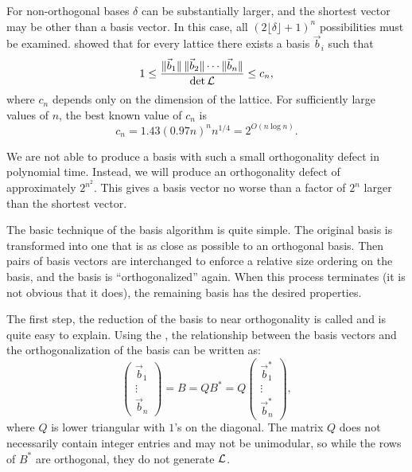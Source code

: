 For non-orthogonal bases $\delta$ can be substantially larger, and the
shortest vector may be other than a basis vector.  In this case, all
$(2\lfloor \delta\rfloor + 1)^n$ possibilities must be examined.
{\Hermite} \cite{Hermite1950-ae} showed that for every lattice there
exists a basis $\vec{b}_i$ such that
\[
1 \le \frac{\|\vec{b}_1\| \, \|\vec{b}_2\| \cdots \|\vec{b}_n\|}{\det {\cal L}}
   \le c_n,
\]
where $c_n$ depends only on the dimension of the lattice.  For
sufficiently large values of $n$, the best known value of $c_n$ is
\[
c_n = 1.43 (0.97 n)^n n^{1/4} = 2^{O(n\log n)}.
\]

We are not able to produce a basis with such a small orthogonality
defect in polynomial time.  Instead, we will produce an orthogonality
defect of approximately $2^{n^2}$.  This gives a basis vector no
worse than a factor of $2^n$ larger than the shortest vector.

\medskip
The basic technique of the {\Lovasz} basis algorithm is quite simple.
The original basis is transformed into one that is as close as
possible to an orthogonal basis.  Then pairs of basis vectors are
interchanged to enforce a relative size ordering on the basis, and the
basis is ``orthogonalized'' again.  When this process terminates (it
is not obvious that it does), the remaining basis has the desired
properties.

The first step, the reduction of the basis to near orthogonality is
called  and is
quite easy to explain.  Using the , the
relationship between the basis vectors and the orthogonalization of
the basis can be written as:
\begin{equation} \label{Lat:WeakB:Eq}
\left(
 \begin{array}{c} \vec{b}_1 \\ \vdots \\ \vec{b}_n \end{array}
\right)
= B = Q B^{\ast} = 
Q \left(
 \begin{array}{c} \vec{b}^{\ast}_1 \\ \vdots \\ \vec{b}^{\ast}_n \end{array}
\right),
\end{equation}
where $Q$ is lower triangular with $1$'s on the diagonal.  The matrix
$Q$ does not necessarily contain integer entries and may not be
unimodular, so while the rows of $B^{\ast}$
are orthogonal, they do not generate ${\cal L}$.

